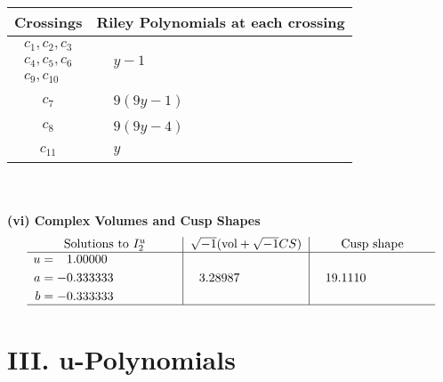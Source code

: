 \documentclass[1p]{elsarticle_modified}
\theoremstyle{definition}
\newcommand{\I}{\sqrt{-1}}
\begin{document}
\begin{tabular}{m{50pt}|m{274pt}}
Crossings & \hspace{64pt}Riley Polynomials at each crossing \\
\hline $$\begin{aligned}c_{1},c_{2},c_{3}\\c_{4},c_{5},c_{6}\\c_{9},c_{10}\end{aligned}$$&$\begin{aligned}
&y-1
\end{aligned}$\\
\hline $$\begin{aligned}c_{7}\end{aligned}$$&$\begin{aligned}
&9(9 y-1)
\end{aligned}$\\
\hline $$\begin{aligned}c_{8}\end{aligned}$$&$\begin{aligned}
&9(9 y-4)
\end{aligned}$\\
\hline $$\begin{aligned}c_{11}\end{aligned}$$&$\begin{aligned}
&y
\end{aligned}$\\
\hline
\end{tabular}\\~\\
\newpage\flushleft \textbf{(vi) Complex Volumes and Cusp Shapes}
$$\begin{array}{c|c|c}  
\text{Solutions to }I^u_{2}& \I (\text{vol} + \sqrt{-1}CS) & \text{Cusp shape}\\
 \hline 
\begin{aligned}
u &= \phantom{-}1.00000\phantom{ +0.000000I} \\
a &= -0.333333\phantom{ +0.000000I} \\
b &= -0.333333\phantom{ +0.000000I}\end{aligned}
 & \phantom{-}3.28987\phantom{ +0.000000I} & \phantom{-}19.1110\phantom{ +0.000000I}\\
 \hline 
 \end{array}$$\newpage
\newpage\renewcommand{\arraystretch}{1}
\centering \section*{ III. u-Polynomials}
\end{document}
